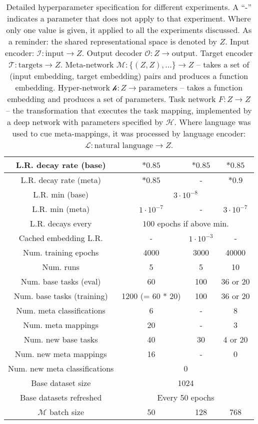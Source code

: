 \documentclass{article}
\begin{document}
\begin{table}
\begin{tabular}{|c||c|c|c|}
L.R. decay rate (base) & $*0.85$ & $*0.85$ & $*0.85$ \\\hline
L.R. decay rate (meta) & $*0.85$ & - & $*0.9$ \\\hline
L.R. min (base) & \multicolumn{3}{c|}{$3 \cdot 10^{-8}$} \\\hline
L.R. min (meta) & $1 \cdot 10^{-7}$& - & $3 \cdot 10^{-7}$ \\\hline
L.R. decays every & \multicolumn{3}{c|}{$100$ epochs if above min.} \\\hline
Cached embedding L.R. & - & $1\cdot 10^{-3}$ & -\\\hline
Num. training epochs & 4000 & 3000 & 40000 \\\hline
Num. runs & 5 & 5 & 10 \\ \hline
\hline
Num. base tasks (eval) & 60 & 100 & 36 or 20 \\\hline
Num. base tasks (training) & 1200 (= 60 * 20) & 100 & 36 or 20  \\\hline
Num. meta classifications & 6 & - & 8  \\\hline
Num. meta mappings & 20 & - & 3  \\\hline
Num. new base tasks & 40 & 30 & 4 or 20 \\\hline 
Num. new meta mappings & 16 & - & 0  \\\hline
Num. new meta classifications &  \multicolumn{3}{c|}{0} \\\hline
Base dataset size & \multicolumn{3}{c|}{1024} \\\hline
Base datasets refreshed & \multicolumn{3}{c|}{Every 50 epochs} \\\hline
$\mathcal{M}$ batch size & 50 & 128 & 768 \\\hline
\end{tabular}
\caption{Detailed hyperparameter specification for different experiments. A ``-'' indicates a parameter that does not apply to that experiment. Where only one value is given, it applied to all the experiments discussed. As a reminder: the shared representational space is denoted by $Z$. Input encoder: $\mathcal{I}: \text{input} \rightarrow Z$. Output decoder $\mathcal{O}: Z \rightarrow \text{output}$. Target encoder $\mathcal{T}: \text{targets} \rightarrow Z$. Meta-network $\mathcal{M}: \{(Z, Z), ...\} \rightarrow Z $ -- takes a set of (input embedding, target embedding) pairs and produces a function embedding. Hyper-network $\mathcal{h}: Z \rightarrow \text{parameters}$ -- takes a function embedding and produces a set of parameters. Task network $F: Z \rightarrow Z$ -- the transformation that executes the task mapping, implemented by a deep network with parameters specified by $\mathcal{H}$. Where language was used to cue meta-mappings, it was processed by language encoder: $\mathcal{L}: \text{natural language} \rightarrow Z$. } \label{supp_hyperparameter_table}
\end{table}
\end{document}
